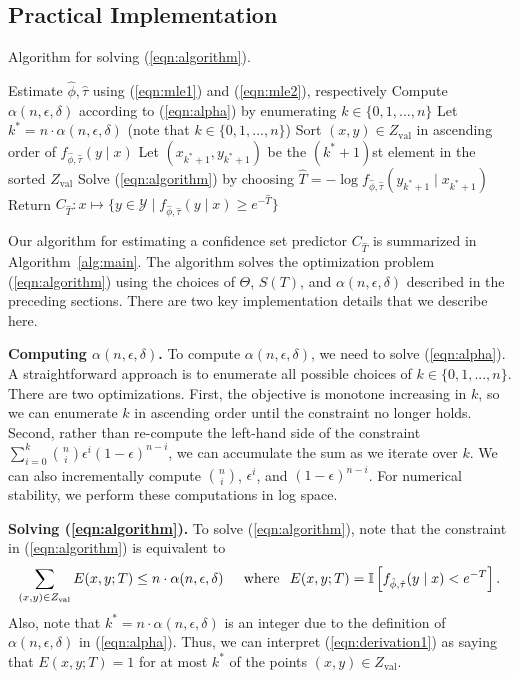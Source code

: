 \documentclass{article} \usepackage{iclr2020_conference,times}
\renewcommand{\(}						{\left(}
\renewcommand{\)}						{\right)}
\renewcommand{\[}						{\left[}
\renewcommand{\]}						{\right]}
\newcommand{\<}						{\left<}
\renewcommand{\>}						{\right>}
\begin{document}
\subsection{Practical Implementation}

\begin{algorithm}[t]
\caption{Algorithm for solving (\ref{eqn:algorithm}).}
\label{alg:main}
\begin{algorithmic}
\State Estimate $\hat{\phi},\hat{\tau}$ using (\ref{eqn:mle1}) and (\ref{eqn:mle2}), respectively
\State Compute $\alpha(n,\epsilon,\delta)$ according to (\ref{eqn:alpha}) by enumerating $k\in\{0,1,...,n\}$
\State Let $k^*=n\cdot\alpha(n,\epsilon,\delta)$ (note that $k\in\{0,1,...,n\}$)
\State Sort $(x,y)\in Z_{\text{val}}$ in ascending order of $f_{\hat{\phi},\hat{\tau}}(y\mid x)$
\State Let $(x_{k^*+1},y_{k^*+1})$ be the $(k^*+1)$st element in the sorted $Z_{\text{val}}$
\State Solve (\ref{eqn:algorithm}) by choosing $\hat{T}=-\log f_{\hat{\phi},\hat{\tau}}(y_{k^*+1}\mid x_{k^*+1})$
\State Return $C_{\hat{T}}:x\mapsto\{y\in\mathcal{Y}\mid f_{\hat{\phi},\hat{\tau}}(y\mid x)\ge e^{-\hat{T}}\}$
\EndProcedure
\end{algorithmic}
\end{algorithm}


Our algorithm for estimating a confidence set predictor $C_{\hat{T}}$ is summarized in Algorithm~\ref{alg:main}. The algorithm solves the optimization problem (\ref{eqn:algorithm}) using the choices of $\Theta$, $S(T)$, and $\alpha(n,\epsilon,\delta)$ described in the preceding sections. There are two key implementation details that we describe here.

\textbf{Computing $\alpha(n,\epsilon,\delta)$.}
To compute $\alpha(n,\epsilon,\delta)$, we need to solve (\ref{eqn:alpha}). A straightforward approach is to enumerate all possible choices of $k\in\{0,1,...,n\}$. There are two optimizations. First, the objective is monotone increasing in $k$, so we can enumerate $k$ in ascending order until the constraint no longer holds. Second, rather than re-compute the left-hand side of the constraint $\sum_{i=0}^k{n\choose i}\epsilon^i(1-\epsilon)^{n-i}$, we can accumulate the sum as we iterate over $k$. We can also incrementally compute ${n\choose i}$, $\epsilon^i$, and $(1-\epsilon)^{n-i}$. For numerical stability, we perform these computations in log space.


\textbf{Solving (\ref{eqn:algorithm}).}
To solve (\ref{eqn:algorithm}), note that the constraint in (\ref{eqn:algorithm}) is equivalent to
\begin{align}
\label{eqn:derivation1}
\sum_{(x,y)\in Z_{\text{val}}}E(x,y;T)\le n\cdot\alpha(n,\epsilon,\delta)\hspace{0.2in}\text{where}\hspace{0.1in}E(x,y;T)=\mathbb{I}\left[f_{\hat{\phi},\hat{\tau}}(y\mid x)< e^{-T}\right].
\end{align}
Also, note that $k^*=n\cdot\alpha(n,\epsilon,\delta)$ is an integer due to the definition of $\alpha(n,\epsilon,\delta)$ in (\ref{eqn:alpha}). Thus, we can interpret (\ref{eqn:derivation1}) as saying that $E(x,y;T)=1$ for at most $k^*$ of the points $(x,y)\in Z_{\text{val}}$.
\end{document}
